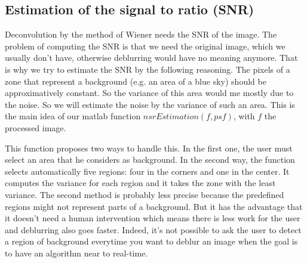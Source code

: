 \subsection{Estimation of the signal to  ratio (SNR)}

Deconvolution by the method of Wiener needs the SNR of the image. The problem of computing the SNR is that we need the original image, which we usually don't have, otherwise deblurring would have no meaning anymore. That is why we try to estimate the SNR by the following reasoning. The pixels of a zone that represent a background (e.g. an area of a blue sky) should be approximatively constant. So the variance of this area would me mostly due to the noise. So we will estimate the noise by the variance of such an area. This is the main idea of our matlab function $nsrEstimation(f,psf)$, with $f$ the processed image. %

This function proposes two ways to handle this. In the first one, the user must select an area that he considers as background. In the second way, the function selects automatically five regions: four in the corners and one in the center. It computes the variance for each region and it takes the zone with the least variance. The second method is probably less precise because the predefined regions might not represent parts of a background. But it has the advantage that it doesn't need a human intervention which means there is less work for the user and deblurring also goes faster. Indeed, it's not possible to ask the user to detect a region of background everytime you want to deblur an image when the goal is to have an algorithm near to real-time.